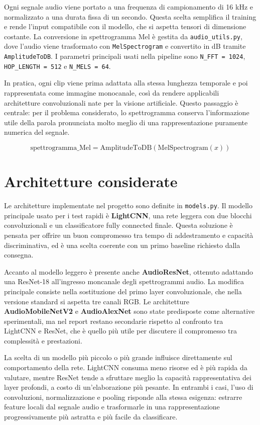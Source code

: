 \documentclass[a4paper,12pt]{article}
\begin{document}
Ogni segnale audio viene portato a una frequenza di campionamento di 16 kHz e normalizzato a una durata fissa di un secondo. Questa scelta semplifica il training e rende l'input compatibile con il modello, che si aspetta tensori di dimensione costante. La conversione in spettrogramma Mel è gestita da \texttt{audio\_utils.py}, dove l'audio viene trasformato con \texttt{MelSpectrogram} e convertito in dB tramite \texttt{AmplitudeToDB}. I parametri principali usati nella pipeline sono \texttt{N\_FFT = 1024}, \texttt{HOP\_LENGTH = 512} e \texttt{N\_MELS = 64}.

In pratica, ogni clip viene prima adattata alla stessa lunghezza temporale e poi rappresentata come immagine monocanale, così da rendere applicabili architetture convoluzionali nate per la visione artificiale. Questo passaggio è centrale: per il problema considerato, lo spettrogramma conserva l'informazione utile della parola pronunciata molto meglio di una rappresentazione puramente numerica del segnale.

\[
	\text{spettrogramma\_Mel} = \mathrm{AmplitudeToDB}(\mathrm{MelSpectrogram}(x))
\]

\section{Architetture considerate}

Le architetture implementate nel progetto sono definite in \texttt{models.py}. Il modello principale usato per i test rapidi è \textbf{LightCNN}, una rete leggera con due blocchi convoluzionali e un classificatore fully connected finale. Questa soluzione è pensata per offrire un buon compromesso tra tempo di addestramento e capacità discriminativa, ed è una scelta coerente con un primo baseline richiesto dalla consegna.

Accanto al modello leggero è presente anche \textbf{AudioResNet}, ottenuto adattando una ResNet-18 all'ingresso moncanale degli spettrogrammi audio. La modifica principale consiste nella sostituzione del primo layer convoluzionale, che nella versione standard si aspetta tre canali RGB. Le architetture \textbf{AudioMobileNetV2} e \textbf{AudioAlexNet} sono state predisposte come alternative sperimentali, ma nel report restano secondarie rispetto al confronto tra LightCNN e ResNet, che è quello più utile per discutere il compromesso tra complessità e prestazioni.

La scelta di un modello più piccolo o più grande influisce direttamente sul comportamento della rete. LightCNN consuma meno risorse ed è più rapida da valutare, mentre ResNet tende a sfruttare meglio la capacità rappresentativa dei layer profondi, a costo di un'elaborazione più pesante. In entrambi i casi, l'uso di convoluzioni, normalizzazione e pooling risponde alla stessa esigenza: estrarre feature locali dal segnale audio e trasformarle in una rappresentazione progressivamente più astratta e più facile da classificare.
\end{document}
